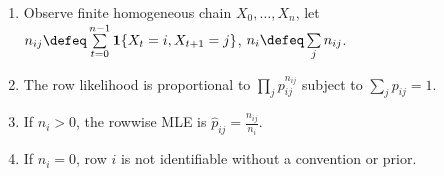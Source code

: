 \begin{method} \label{method:markov-transition-mle} 
\begin{enumerate}[label=(\roman*)]
\setlength{\itemsep}{0pt}
\item Observe finite homogeneous chain $X_0,\ldots,X_n$, let $n_{ij}\defeq\sum\limits_{t=0}^{n-1}\mathbf{1}\{X_t=i,X_{t+1}=j\}$, $n_i\defeq\sum\limits_j n_{ij}$.
\item The row likelihood is proportional to $\prod\limits_j p_{ij}^{n_{ij}}$ subject to $\sum\limits_j p_{ij}=1$.
\item If $n_i>0$, the rowwise MLE is $\widehat{p}_{ij}=\frac{n_{ij}}{n_i}$.
\item If $n_i=0$, row $i$ is not identifiable without a convention or prior.
\end{enumerate}
\end{method}
